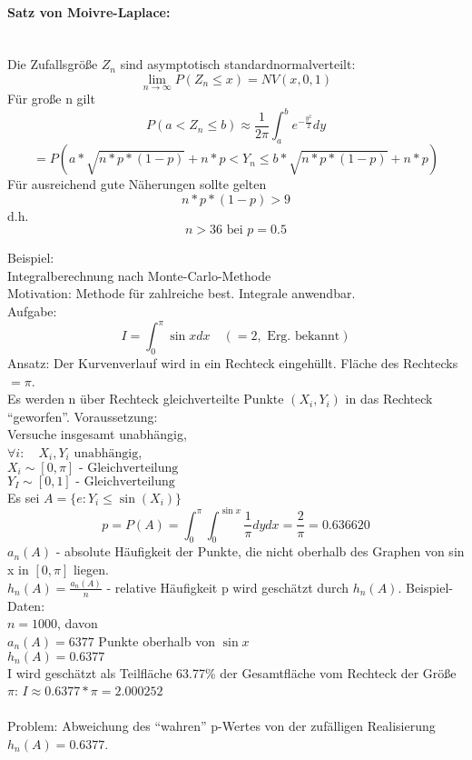\documentclass[a4paper,12pt]{scrartcl}
\begin{document}
  \paragraph{Satz von Moivre-Laplace:}\quad\\
  Die Zufallsgröße $Z_n$ sind asymptotisch standardnormalverteilt:
  $$\lim_{n\rightarrow \infty}P(Z_n\leq x) = NV(x,0,1)$$
  Für große n gilt
  $$P(a<Z_n\leq b) \approx \frac{1}{2\pi}\int^b_a e^{-\frac{y^2}{2}}dy $$
  $$=P(a*\sqrt{n*p*(1-p)}+n*p < Y_n \leq b*\sqrt{n*p*(1-p)}+n*p)$$
  Für ausreichend gute Näherungen sollte gelten
  $$n*p*(1-p)>9$$
  d.h.
  $$n>36\text{ bei }p=0.5$$
  
  Beispiel:\\
  Integralberechnung nach Monte-Carlo-Methode\\
  Motivation: Methode für zahlreiche best. Integrale anwendbar.\\
  Aufgabe:
  $$I=\int^\pi_0\sin x dx\quad(=2,\text{ Erg. bekannt})$$
  Ansatz: Der Kurvenverlauf wird in ein Rechteck eingehüllt.
  Fläche des Rechtecks $=\pi$.\\
  Es werden n über Rechteck gleichverteilte Punkte $(X_i,Y_i)$ in das Rechteck "`geworfen"'. Voraussetzung:\\ 
  \quad Versuche insgesamt unabhängig,\\
  \quad $\forall i:\quad X_i,Y_i\text{ unabhängig}$,\\
  \quad $X_i\sim [0,\pi]\text{ - Gleichverteilung}$\\
  \quad $Y_I\sim [0,1]\text{ - Gleichverteilung} $\\
  Es sei $A=\{e: Y_i\leq\sin(X_i)\}$
  $$p=P(A)=\int^\pi_0\int^{\sin x}_0\frac{1}{\pi}dydx=\frac{2}{\pi}=0.636620$$
  $a_n(A)$ - absolute Häufigkeit der Punkte, die nicht oberhalb des Graphen von sin x in $[0,\pi]$ liegen.\\
  $h_n(A) = \frac{a_n(A)}{n}$ - relative Häufigkeit
  p wird geschätzt durch $h_n(A)$.
  Beispiel-Daten:\\
  $n=1000$, davon\\
  $a_n(A)=6377$ Punkte oberhalb von $\sin x$\\
  $h_n(A)=0.6377$\\
  I wird geschätzt als Teilfläche 63.77\% der Gesamtfläche vom Rechteck der Größe $\pi$: $I\approx0.6377*\pi=2.000252$\\
  \\
  Problem: Abweichung des "`wahren"' p-Wertes von der zufälligen Realisierung $h_n(A)=0.6377$.\\
\end{document}
